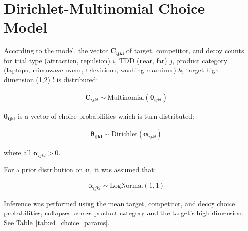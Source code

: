 \section{Dirichlet-Multinomial Choice Model}

According to the model, the vector $\bm{C_{ijkl}}$ of target, competitor, and decoy counts for trial type (attraction, repulsion) $i$, TDD (near, far) $j$, product category (laptops, microwave ovens, televisions, washing machines)  $k$, target high dimension (1,2) $l$ is distributed:

\begin{align}
    \bm{C}_{ijkl} \sim \text{Multinomial}(\boldsymbol{\theta}_{ijkl})
\end{align}

$\boldsymbol{\theta_{ijkl}}$ is a vector of choice probabilities which is turn distributed:

\begin{align}
    \boldsymbol{\theta_{ijkl}} \sim \text{Dirichlet}(\boldsymbol{\alpha}_{ijkl})
\end{align}

where all $\boldsymbol{\alpha}_{ijkl}>0$. 

For a prior distribution on $\boldsymbol{\alpha}$, it was assumed that:

\begin{align}
    \boldsymbol{\alpha}_{ijkl} \sim \text{LogNormal}(1,1)
\end{align}

Inference was performed using the mean target, competitor, and decoy choice probabilities, collapsed across product category and the target's high dimension. See Table~\ref{tab:e4_choice_params}.

